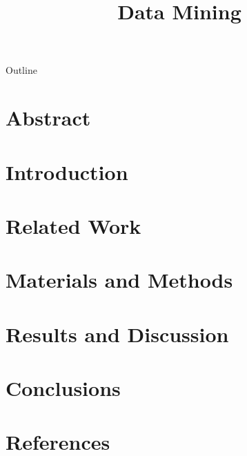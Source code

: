 \documentclass[9pt]{beamer}
\title[Beamer Name]{Data Mining} %
\author[]{ \textbf{\Large }} %
\institute[SEMO]{\large mail@semo.edu}
\date{}
\begin{document}
\frame[plain]{\titlepage}


\begin{frame}{Outline}
  \tableofcontents
\end{frame}

\section{Abstract}
    
\section{Introduction}
    
\section{Related Work}
    
\section{Materials and Methods}
    
\section{Results and Discussion}
    
\section{Conclusions}
    
\section{References}
    
\end{document}
